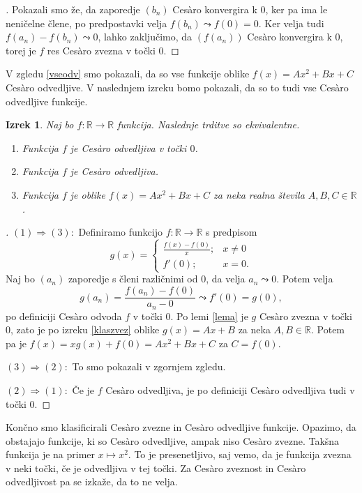 \documentclass[a4paper,12pt]{article}
\theoremstyle{definition}
\theoremstyle{plain}
\newtheorem{izrek}{Izrek}
\newenvironment{dokaz}{\begin{proof}[\bfseries\upshape\proofname]}{\end{proof}}
\begin{document}
\begin{dokaz}
    Pokazali smo že, da zaporedje $(b_n)$ Ces\`{a}ro konvergira k $0$, ker pa ima le neničelne člene, po predpostavki velja $f(b_n) \leadsto f(0) = 0$. Ker velja tudi $f(a_n) - f(b_n) \leadsto 0$, lahko zaključimo, da $(f(a_n))$ Ces\`{a}ro konvergira k $0$, torej je $f$ res Ces\`{a}ro zvezna v točki $0$.
\end{dokaz}

V zgledu \ref{vseodv} smo pokazali, da so vse funkcije oblike $f(x) = Ax^2 + Bx + C$ Ces\`{a}ro odvedljive. V naslednjem izreku bomo pokazali, da so to tudi vse Ces\`{a}ro odvedljive funkcije.

\begin{izrek}
    \label{klasodv}
    Naj bo $f: \mathbb{R} \rightarrow \mathbb{R}$ funkcija. Naslednje trditve so ekvivalentne.
    \begin{enumerate}
        \item Funkcija $f$ je Ces\`{a}ro odvedljiva v točki $0$.
        \item Funkcija $f$ je Ces\`{a}ro odvedljiva.
        \item Funkcija $f$ je oblike $f(x) = Ax^2 + Bx + C$ za neka realna števila $A, B, C \in \mathbb{R}$.
    \end{enumerate}
\end{izrek}
\begin{dokaz}
    $(1) \Rightarrow (3): $ Definiramo funkcijo $f: \mathbb{R} \rightarrow \mathbb{R}$ s predpisom 
    $$
    g(x) = \begin{cases}
        \frac{f(x)-f(0)}{x}; & x \neq 0\\
        f'(0); & x = 0.
    \end{cases}
    $$
    Naj bo $(a_n)$ zaporedje s členi različnimi od $0$, da velja $a_n \leadsto 0$. Potem velja 
    $$g(a_n) = \frac{f(a_n)-f(0)}{a_n-0} \leadsto f'(0) = g(0),$$
    po definiciji Ces\`{a}ro odvoda $f$ v točki $0$. Po lemi \ref{lema} je $g$ Ces\`{a}ro zvezna v točki $0$, zato je po izreku \ref{klaszvez} oblike $g(x) = Ax + B$ za neka $A, B \in \mathbb{R}$. Potem pa je 
    $f(x) = xg(x) + f(0) = Ax^2 + Bx + C$ za $C = f(0)$.

    $(3) \Rightarrow (2): $ To smo pokazali v zgornjem zgledu.

    $(2) \Rightarrow (1): $ Če je $f$ Ces\`{a}ro odvedljiva, je po definiciji Ces\`{a}ro odvedljiva tudi v točki $0$.
\end{dokaz}
Končno smo klasificirali Ces\`{a}ro zvezne in Ces\`{a}ro odvedljive funkcije. Opazimo, da obstajajo funkcije, ki so Ces\`{a}ro odvedljive, ampak niso Ces\`{a}ro zvezne. Takšna funkcija je na primer $x \mapsto x^2$. To je presenetljivo, saj vemo, da je funkcija zvezna v neki točki, če je odvedljiva v tej točki. Za Ces\`{a}ro zveznost in Ces\`{a}ro odvedljivost pa se izkaže, da to ne velja.
\end{document}

